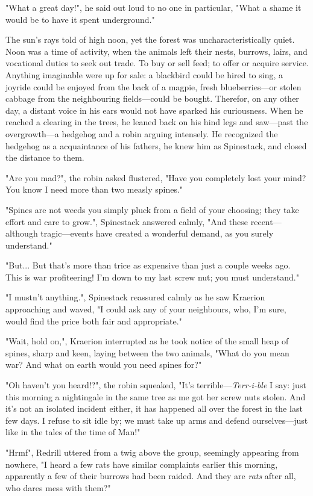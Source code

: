 "What a great day!", he said out loud to no one in particular, "What a shame it would be to have it spent underground."

The sun's rays told of high noon, yet the forest was uncharacteristically quiet. Noon was a time of activity, when the animals left their nests, burrows, lairs, and vocational duties to seek out trade. To buy or sell feed; to offer or acquire service. Anything imaginable were up for sale: a blackbird could be hired to sing, a joyride could be enjoyed from the back of a magpie, fresh blueberries---or stolen cabbage from the neighbouring fields---could be bought. Therefor, on any other day, a distant voice in his ears would not have sparked his curiousness. When he reached a clearing in the trees, he leaned back on his hind legs and saw---past the overgrowth---a hedgehog and a robin arguing intensely. He recognized the hedgehog as a acquaintance of his fathers, he knew him as Spinestack, and closed the distance to them.

 "Are you mad?", the robin asked flustered, "Have you completely lost your mind? You know I need more than two measly spines."
 
 "Spines are not weeds you simply pluck from a field of your choosing; they take effort and care to grow.", Spinestack answered calmly, "And these recent---although tragic---events have created a wonderful demand, as you surely understand."
 
 "But... But that's more than trice as expensive than just a couple weeks ago. This is war profiteering! I'm down to my last screw nut; you must understand."

"I mustn't anything.", Spinestack reassured calmly as he saw Kraerion approaching and waved, "I could ask any of your neighbours, who, I'm sure, would find the price both fair and appropriate."

"Wait, hold on,", Kraerion interrupted as he took notice of the small heap of spines, sharp and keen, laying between the two animals, "What do you mean war? And what on earth would you need spines for?"

"Oh haven't you heard!?", the robin squeaked, "It's terrible---\textit{Terr-i-ble} I say: just this morning a nightingale in the same tree as me got her screw nuts stolen. And it's not an isolated incident either, it has happened all over the forest in the last few days. I refuse to sit idle by; we must take up arms and defend ourselves---just like in the tales of the time of Man!"

"Hrmf", Redrill uttered from a twig above the group, seemingly appearing from nowhere, "I heard a few rats have similar complaints earlier this morning, apparently a few of their burrows had been raided. And they are \textit{rats} after all, who dares mess with them?"

